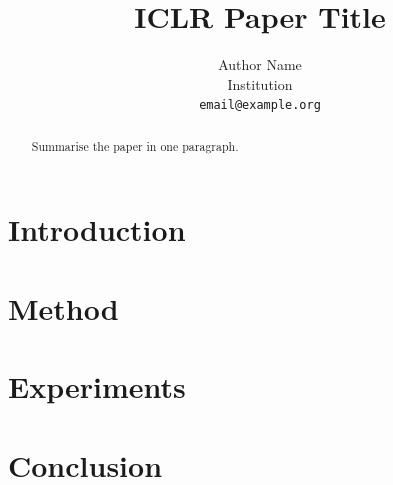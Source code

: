 \documentclass[11pt]{article}
\title{ICLR Paper Title}
\author{Author Name \\ Institution \\ \texttt{email@example.org}}
\begin{document}
\maketitle

\begin{abstract}
Summarise the paper in one paragraph.
\end{abstract}

\section{Introduction}

\section{Method}

\section{Experiments}

\section{Conclusion}
\end{document}
